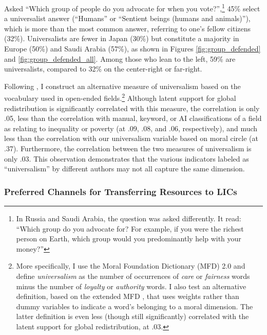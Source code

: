 \documentclass[12pt,english]{article}
\begin{document}
\begin{bibunit}
Asked ``Which group of people do you advocate for when you vote?'',\footnote{In Russia and Saudi Arabia, the question was asked differently. It read: ``Which group do you advocate for? For example, if you were the richest person on Earth, which group would you predominantly help with your money?''\label{fn:group_defended}} 
45\% select a universalist answer (``Humans'' or ``Sentient beings (humans and animals)''), which is more than the most common answer, referring to one's fellow citizens (32\%). Universalists are fewer in Japan (30\%) %
but constitute a  majority in Europe (50\%) and Saudi Arabia (57\%), as shown in Figures \ref{fig:group_defended} and \ref{fig:group_defended_all}.
Among those who lean to the left, 59\% are universalists, compared to 32\% on the center-right or far-right. %

Following \cite{enke_universalism_2024}, I construct an alternative measure of universalism based on the vocabulary used in open-ended fields.\footnote{More specifically, I use the Moral Foundation Dictionary (MFD) 2.0 \citep{frimer_moral_2019} and define \textit{universalism} as the number of occurrences of \textit{care} or \textit{fairness} words minus the number of \textit{loyalty} or \textit{authority} words. I also test an alternative definition, based on the extended MFD \citep{hopp_extended_2021}, that uses weights rather than dummy variables to indicate a word's belonging to a moral dimension. The latter definition is even less (though still significantly) correlated with the latent support for global redistribution, at .03.} 
Although latent support for global redistribution is significantly correlated with this measure, the correlation is only .05, less than the correlation with manual, keyword, or AI classifications of a field as relating to inequality or poverty (at .09, .08, and .06, respectively), and much less than the correlation with our universalism variable based on moral circle (at .37). Furthermore, the correlation between the two measures of universalism is only .03. This observation demonstrates that the various indicators labeled as ``universalism'' by different authors may not all capture the same dimension.


\subsubsection{Preferred Channels for Transferring Resources to LICs}\label{subsec:transfer_how}


\end{bibunit}
\end{document}

